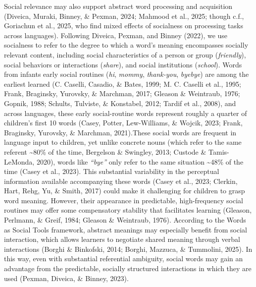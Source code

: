 \documentclass[
  man,floatsintext]{apa6}
\begin{document}
Social relevance may also support abstract word processing and acquisition (Diveica, Muraki, Binney, \& Pexman, 2024; Mahmood et al., 2025; though c.f., Goriachun et al., 2025, who find mixed effects of socialness on processing tasks across languages). Following Diveica, Pexman, and Binney (2022), we use socialness to refer to the degree to which a word's meaning encompasses socially relevant content, including social characteristics of a person or group (\emph{friendly}), social behaviors or interactions (\emph{share}), and social institutions (\emph{school}). Words from infants early social routines (\emph{hi}, \emph{mommy}, \emph{thank-you}, \emph{byebye}) are among the earliest learned (C. Caselli, Casadio, \& Bates, 1999; M. C. Caselli et al., 1995; Frank, Braginsky, Yurovsky, \& Marchman, 2017; Gleason \& Weintraub, 1976; Gopnik, 1988; Schults, Tulviste, \& Konstabel, 2012; Tardif et al., 2008), and across languages, these early social-routine words represent roughly a quarter of children's first 10 words (Casey, Potter, Lew-Williams, \& Wojcik, 2023; Frank, Braginsky, Yurovsky, \& Marchman, 2021).These social words are frequent in language input to children, yet unlike concrete nouns (which refer to the same referent \textasciitilde80\% of the time, Bergelson \& Swingley, 2013; Custode \& Tamis-LeMonda, 2020), words like \emph{``bye''} only refer to the same situation \textasciitilde48\% of the time (Casey et al., 2023). This substantial variability in the perceptual information available accompanying these words (Casey et al., 2023; Clerkin, Hart, Rehg, Yu, \& Smith, 2017) could make it challenging for children to grasp word meaning. However, their appearance in predictable, high-frequency social routines may offer some compensatory stability that facilitates learning (Gleason, Perlmann, \& Greif, 1984; Gleason \& Weintraub, 1976). According to the Words as Social Tools framework, abstract meanings may especially benefit from social interaction, which allows learners to negotiate shared meaning through verbal interactions (Borghi \& Binkofski, 2014; Borghi, Mazzuca, \& Tummolini, 2025). In this way, even with substantial referential ambiguity, social words may gain an advantage from the predictable, socially structured interactions in which they are used (Pexman, Diveica, \& Binney, 2023).
\end{document}

